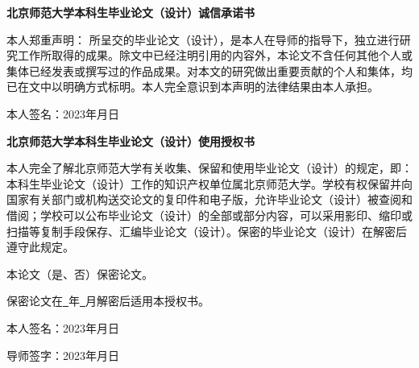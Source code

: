 
\begin{center}
\textbf{\songti 北京师范大学本科生毕业论文（设计）诚信承诺书}
\end{center}
\par 本人郑重声明： 所呈交的毕业论文（设计），是本人在导师的指导下，独立进行研究工作所取得的成果。除文中已经注明引用的内容外，本论文不含任何其他个人或集体已经发表或撰写过的作品成果。对本文的研究做出重要贡献的个人和集体，均已在文中以明确方式标明。本人完全意识到本声明的法律结果由本人承担。
\par\vspace{2em} 本人签名：\hfill 2023年\quad 月\quad 日\hspace{2em}
\\\vspace{4em}
\begin{center}
\textbf{\songti 北京师范大学本科生毕业论文（设计）使用授权书}
\end{center}
\par 本人完全了解北京师范大学有关收集、保留和使用毕业论文（设计）的规定，即：本科生毕业论文（设计）工作的知识产权单位属北京师范大学。学校有权保留并向国家有关部门或机构送交论文的复印件和电子版，允许毕业论文（设计）被查阅和借阅；学校可以公布毕业论文（设计）的全部或部分内容，可以采用影印、缩印或扫描等复制手段保存、汇编毕业论文（设计）。保密的毕业论文（设计）在解密后遵守此规定。
\par\vspace{4em} 本论文（是、否）保密论文。
\par 保密论文在\underline{\qquad\ }年\underline{\qquad\ }月解密后适用本授权书。
\par\vspace{4em} 本人签名：\hfill 2023年\quad 月\quad 日\hspace{2em}
\par\vspace{4em} 导师签字：\hfill 2023年\quad 月\quad 日\hspace{2em}
